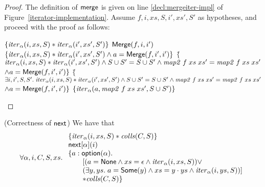 \begin{proof}
The definition of $\mathsf{merge}$ is given on line \ref{decl:mergeiter-impl} of
Figure~\ref{iterator-implementation}. Assume $f, i, xs, S, i', xs', S'$ as 
hypotheses, and proceed with the proof as follows: 

\begin{specification}
\nextline $\{{\mathit{iter}_\alpha(i, xs, S) * \mathit{iter}_\alpha(i',xs',S')}\}$ 
\nextline $\mathsf{Merge}(f, i, i')$
\nextline $\{{\mathit{iter}_\alpha(i, xs, S) * \mathit{iter}_\alpha(i',xs',S') \land a = \mathsf{Merge}(f, i', i')}\}$ 
\nextline $\{$\=$\mathit{iter}_\alpha(i, xs, S) * \mathit{iter}_\alpha(i',xs',S') \land S \cup S' = S \cup S' \land \mathit{map2}\;f\;xs\;xs' = \mathit{map2}\;f\;xs\;xs'$
\nextline \> $\land a = \mathsf{Merge}(f, i', i')\}$ 
\nextline $\{$\=$\exists i, i', S, S'.\; \mathit{iter}_\alpha(i, xs, S) * \mathit{iter}_\alpha(i',xs',S') \land S \cup S' = S \cup S' \land \mathit{map2}\;f\;xs\;xs' = \mathit{map2}\;f\;xs\;xs'$ 
\nextline \> $\land a = \mathsf{Merge}(f, i', i')\}$ 
\nextline $\{{\mathit{iter}_\alpha(a, \mathit{map2}\;f\;xs\;xs', S \cup S')}\}$
\end{specification}
\end{proof}

\begin{lemma}{(Correctness of $\mathsf{next}$)}
We have that 
\begin{displaymath}
  \forall \alpha, i, C, S, xs.\; 
  \begin{array}{l}
    \{{\mathit{iter}_\alpha(i, xs, S) * \mathit{colls}(C,S)}\} \\
    \mathsf{next}[\alpha](i) \\
    \{a:\mathsf{option }{(\alpha)}.\; \\
      \qquad [(a = \mathsf{None} \land xs = \epsilon \land \mathit{iter}_\alpha(i, xs, S)) \vee \\
      \qquad (\exists y, ys.\; a = \mathsf{Some}(y) \land xs = y\cdot ys \land \mathit{iter}_\alpha(i, ys, S))]
       \\
      \qquad * \mathit{colls}(C,S)\} \\
  \end{array}
\end{displaymath}
\end{lemma}

